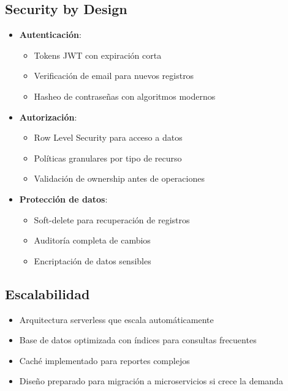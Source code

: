 \subsection{Security by Design}
\begin{itemize}
    \item \textbf{Autenticación}:
    \begin{itemize}
        \item Tokens JWT con expiración corta
        \item Verificación de email para nuevos registros
        \item Hasheo de contraseñas con algoritmos modernos
    \end{itemize}
    \item \textbf{Autorización}:
    \begin{itemize}
        \item Row Level Security para acceso a datos
        \item Políticas granulares por tipo de recurso
        \item Validación de ownership antes de operaciones
    \end{itemize}
    \item \textbf{Protección de datos}:
    \begin{itemize}
        \item Soft-delete para recuperación de registros
        \item Auditoría completa de cambios
        \item Encriptación de datos sensibles
    \end{itemize}
\end{itemize}

\subsection{Escalabilidad}
\begin{itemize}
    \item Arquitectura serverless que escala automáticamente
    \item Base de datos optimizada con índices para consultas frecuentes
    \item Caché implementado para reportes complejos
    \item Diseño preparado para migración a microservicios si crece la demanda
\end{itemize}